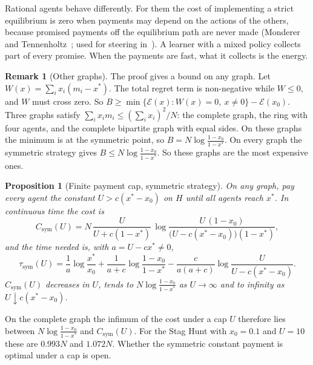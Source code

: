 \documentclass[11pt,a4paper]{article}
\theoremstyle{definition}
\newtheorem{remark}{Remark}
\theoremstyle{plain}
\newtheorem{proposition}{Proposition}
\newcommand{\Binf}{B}
\newcommand{\xs}{x^{*}}
\newcommand{\En}{\mathcal{E}}
\begin{document}
Rational agents behave differently. For them the cost of implementing a strict equilibrium is zero when payments may depend on the actions of the others, because promised payments off the equilibrium path are never made (Monderer and Tennenholtz~\cite{monderer2004}; used for steering in~\cite{zhang2024}). A learner with a mixed policy collects part of every promise. When the payments are fast, what it collects is the energy.

\begin{remark}[Other graphs]\label{rem:general}
The proof gives a bound on any graph. Let $W(x)=\sum_ix_i(m_i-\xs)$. The total regret term is non-negative while $W\le0$, and $W$ must cross zero. So $\Binf\ge\min\{\En(x):W(x)=0,\ x\ne0\}-\En(x_0)$. Three graphs satisfy $\sum_ix_im_i\le(\sum_ix_i)^2/N$: the complete graph, the ring with four agents, and the complete bipartite graph with equal sides. On these graphs the minimum is at the symmetric point, so $\Binf=N\log\frac{1-x_0}{1-\xs}$. On every graph the symmetric strategy gives $\Binf\le N\log\frac{1-x_0}{1-\xs}$. So these graphs are the most expensive ones.
\end{remark}

\begin{proposition}[Finite payment cap, symmetric strategy]\label{prop:cap}
On any graph, pay every agent the constant $U>c(\xs-x_0)$ on $H$ until all agents reach $\xs$. In continuous time the cost is
\begin{equation}\label{eq:cap}
C_{\mathrm{sym}}(U)=N\,\frac{U}{U+c(1-\xs)}\,\log\frac{U\,(1-x_0)}{\bigl(U-c(\xs-x_0)\bigr)(1-\xs)},
\end{equation}
and the time needed is, with $a=U-c\xs\neq0$,
\begin{equation}\label{eq:captime}
\tau_{\mathrm{sym}}(U)=\frac1a\log\frac{\xs}{x_0}+\frac{1}{a+c}\log\frac{1-x_0}{1-\xs}-\frac{c}{a(a+c)}\log\frac{U}{U-c(\xs-x_0)} .
\end{equation}
$C_{\mathrm{sym}}(U)$ decreases in $U$, tends to $N\log\frac{1-x_0}{1-\xs}$ as $U\to\infty$ and to infinity as $U\downarrow c(\xs-x_0)$.
\end{proposition}

On the complete graph the infimum of the cost under a cap $U$ therefore lies between $N\log\frac{1-x_0}{1-\xs}$ and $C_{\mathrm{sym}}(U)$. For the Stag Hunt with $x_0=0.1$ and $U=10$ these are $0.993N$ and $1.072N$. Whether the symmetric constant payment is optimal under a cap is open.

\end{document}
